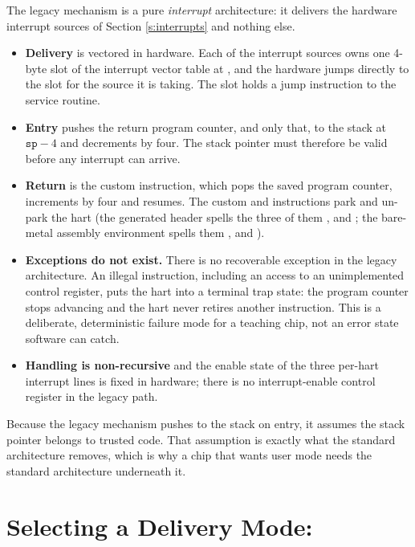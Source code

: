 The legacy mechanism is a pure \textit{interrupt} architecture: it delivers the hardware interrupt sources of Section \ref{s:interrupts} and nothing else.

\begin{itemize}
	\item \textbf{Delivery} is vectored in hardware. Each of the \VectorsCount{} interrupt sources owns one 4-byte slot of the interrupt vector table at \texttt{\VectorsStartAddress}, and the hardware jumps directly to the slot for the source it is taking. The slot holds a jump instruction to the service routine.
	\item \textbf{Entry} pushes the return program counter, and only that, to the stack at $\mathtt{sp}-4$ and decrements  by four. The stack pointer must therefore be valid before any interrupt can arrive.
	\item \textbf{Return} is the custom  instruction, which pops the saved program counter, increments  by four and resumes. The custom  and  instructions park and un-park the hart (the generated header spells the three of them ,  and ; the bare-metal assembly environment spells them ,  and ).
	\item \textbf{Exceptions do not exist.} There is no recoverable exception in the legacy architecture. An illegal instruction, including an access to an unimplemented control register, puts the hart into a terminal trap state: the program counter stops advancing and the hart never retires another instruction. This is a deliberate, deterministic failure mode for a teaching chip, not an error state software can catch.
	\item \textbf{Handling is non-recursive} and the enable state of the three per-hart interrupt lines is fixed in hardware; there is no interrupt-enable control register in the legacy path.
\end{itemize}

Because the legacy mechanism pushes to the stack on entry, it assumes the stack pointer belongs to trusted code. That assumption is exactly what the standard architecture removes, which is why a chip that wants user mode needs the standard architecture underneath it.

\ifprivtrapcsr

\section{Selecting a Delivery Mode: } \label{ss:priv-mtrapctl}

